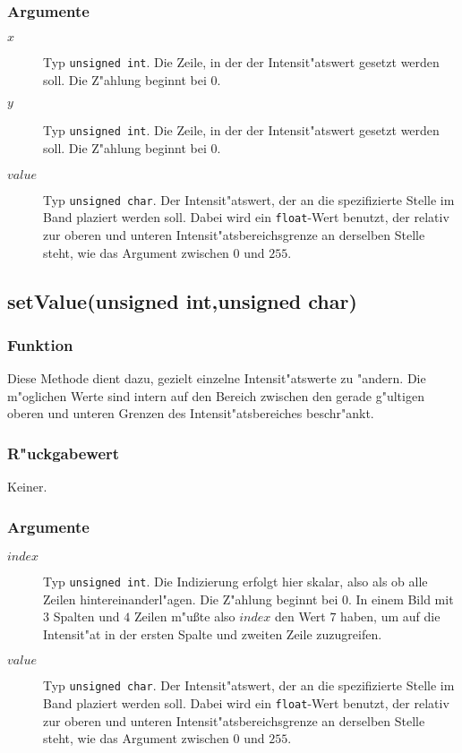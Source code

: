 \documentclass[12pt,a4paper,draft,twoside,onecolumn,titlepage]{book}
\newcommand{\carg}[1]{$ #1 $}
\newcommand{\ctyp}[1]{{\tt #1}}
\newcommand{\arglist}[1]{\footnotesize{#1}}
\begin{document}
\subsubsection{Argumente} 
\begin{description}
\item[\carg{x}]{Typ \ctyp{unsigned int}.  Die Zeile, in der der Intensit"atswert gesetzt werden soll. Die Z"ahlung beginnt bei $0$.} 
\item[\carg{y}]{Typ \ctyp{unsigned int}.  Die Zeile, in der der Intensit"atswert gesetzt werden soll. Die Z"ahlung beginnt bei $0$.} 
\item[\carg{value}]{Typ \ctyp{unsigned char}. Der Intensit"atswert, der an die spezifizierte Stelle im Band plaziert werden soll. Dabei wird ein \ctyp{float}-Wert benutzt, der relativ zur oberen und unteren Intensit"atsbereichsgrenze an derselben Stelle steht, wie das Argument zwischen $0$ und $255$.}
\end{description}
\subsection{setValue\arglist{(unsigned int,unsigned char)}}
\subsubsection{Funktion}
Diese Methode dient dazu, gezielt einzelne Intensit"atswerte zu "andern. Die m"oglichen Werte sind intern auf den Bereich zwischen den gerade g"ultigen oberen und unteren Grenzen des Intensit"atsbereiches beschr"ankt.
\subsubsection{R"uckgabewert}
Keiner.
\subsubsection{Argumente} 
\begin{description}
\item[\carg{index}]{Typ \ctyp{unsigned int}.  Die Indizierung erfolgt hier skalar, also als ob alle Zeilen hintereinanderl"agen. Die Z"ahlung beginnt bei $0$. In einem Bild mit $3$ Spalten und $4$ Zeilen m"u{\ss}te also \carg{index} den Wert $7$ haben, um auf die Intensit"at in der ersten Spalte und zweiten Zeile zuzugreifen.} 
\item[\carg{value}]{Typ \ctyp{unsigned char}. Der Intensit"atswert, der an die spezifizierte Stelle im Band plaziert werden soll. Dabei wird ein \ctyp{float}-Wert benutzt, der relativ zur oberen und unteren Intensit"atsbereichsgrenze an derselben Stelle steht, wie das Argument zwischen $0$ und $255$.}
\end{description}
\end{document}
